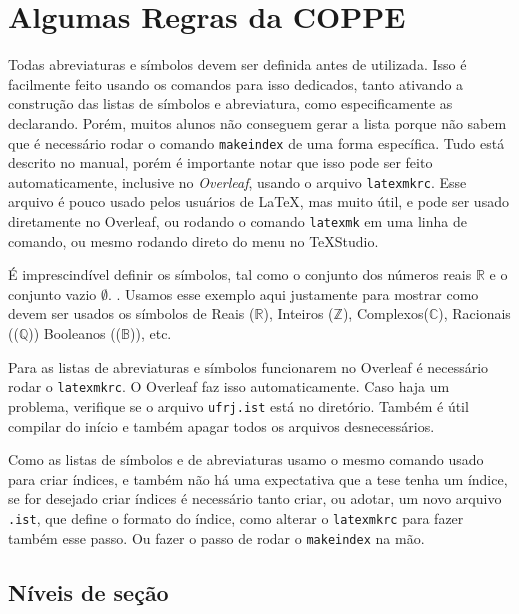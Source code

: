 \documentclass[dsc,pdfa,setavermelha]{ufrj}
\theoremstyle{plain}
\theoremstyle{definition}
\theoremstyle{remark}
\begin{document}
\chapter{Algumas Regras da COPPE}

  Todas abreviaturas e símbolos devem ser definida antes de utilizada. Isso é facilmente feito usando os comandos para isso dedicados, tanto ativando a construção das listas de símbolos e abreviatura, como especificamente as declarando. Porém, muitos alunos não conseguem gerar a lista porque não sabem que é necessário rodar o comando \verb*|makeindex| de uma forma específica. Tudo está descrito no manual, porém é importante notar que isso pode ser feito automaticamente, inclusive no \textit{Overleaf}, usando o arquivo \verb*|latexmkrc|. Esse arquivo é pouco usado pelos usuários de \LaTeX, mas muito útil, e pode ser usado diretamente no Overleaf, ou rodando o comando \verb|latexmk| em uma linha de comando, ou mesmo rodando direto do menu no \TeX Studio.

  É imprescindível definir os símbolos, tal como o
  conjunto dos números reais $\mathbb{R}$ e o conjunto vazio $\emptyset$.
  . Usamos esse exemplo aqui justamente para mostrar como devem ser usados os símbolos de Reais ($\mathbb{R}$), Inteiros ($\mathbb{Z}$), Complexos($\mathbb{C}$), Racionais (($\mathbb{Q}$)) Booleanos (($\mathbb{B}$)), etc.

  Para as listas de abreviaturas e símbolos funcionarem no Overleaf é necessário rodar o \verb|latexmkrc|. O Overleaf faz isso automaticamente. Caso haja um problema, verifique se o arquivo \verb|ufrj.ist| está no diretório. Também é útil compilar do início e também apagar todos os arquivos desnecessários.

  Como as listas de símbolos e de abreviaturas usamo o mesmo comando usado para criar índices, e também não há uma expectativa que a tese tenha um índice, se for desejado criar índices é necessário tanto criar, ou adotar, um novo arquivo \verb*|.ist|, que define o formato do índice, como alterar o \verb*|latexmkrc| para fazer também esse passo. Ou fazer o passo de rodar o \verb*|makeindex| na mão.

\section{Níveis de seção}
\label{sec:niveis}
\end{document}
